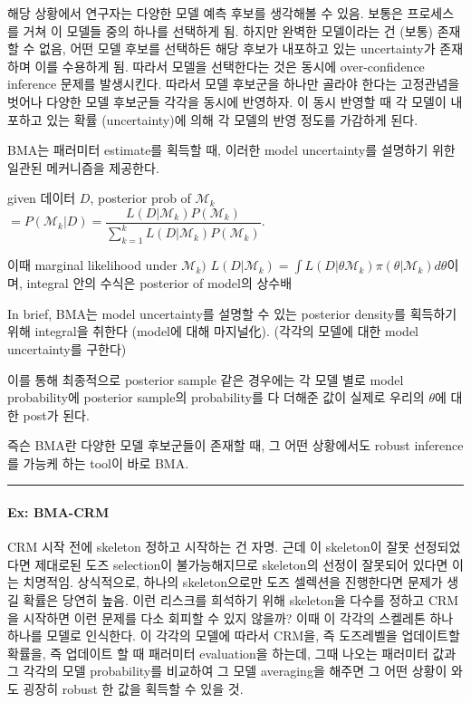 \documentclass[
]{book}
\begin{document}
해당 상황에서 연구자는 다양한 모델 예측 후보를 생각해볼 수 있음. 보통은 프로세스를 거쳐 이 모델들 중의 하나를 선택하게 됨. 하지만 완벽한 모델이라는 건 (보통) 존재할 수 없음, 어떤 모델 후보를 선택하든 해당 후보가 내포하고 있는 uncertainty가 존재하며 이를 수용하게 됨. 따라서 모델을 선택한다는 것은 동시에 over-confidence inference 문제를 발생시킨다. 따라서 모델 후보군을 하나만 골라야 한다는 고정관념을 벗어나 다양한 모델 후보군들 각각을 동시에 반영하자. 이 동시 반영할 때 각 모델이 내포하고 있는 확률 (uncertainty)에 의해 각 모델의 반영 정도를 가감하게 된다.

BMA는 패러미터 estimate를 획득할 때, 이러한 model uncertainty를 설명하기 위한 일관된 메커니즘을 제공한다.

given 데이터 \(D\), posterior prob of \(\mathcal{M}_k\) \(= P(\mathcal{M}_k \vert D) = \dfrac{L(D \vert \mathcal{M}_k) P(\mathcal{M}_k)}{\sum_{k=1}^k L(D \vert \mathcal{M}_k) P(\mathcal{M}_k)}\).

이때 marginal likelihood under \(\mathcal{M}_k)\) \(L(D \vert \mathcal{M}_k) = \int L(D \vert \theta \mathcal{M}_k) \pi(\theta \vert \mathcal{M}_k) d \theta\)이며, integral 안의 수식은 posterior of model의 상수배

In brief, BMA는 model uncertainty를 설명할 수 있는 posterior density를 획득하기 위해 integral을 취한다 (model에 대해 마지널化). (각각의 모델에 대한 model uncertainty를 구한다)

이를 통해 최종적으로 posterior sample 같은 경우에는 각 모델 별로 model probability에 posterior sample의 probability를 다 더해준 값이 실제로 우리의 \(\theta\)에 대한 post가 된다.

즉슨 BMA란 다양한 모델 후보군들이 존재할 때, 그 어떤 상황에서도 robust inference를 가능케 하는 tool이 바로 BMA.

\begin{center}\rule{0.5\linewidth}{0.5pt}\end{center}

\hypertarget{ex-bma-crm}{%
\paragraph{Ex: BMA-CRM}\label{ex-bma-crm}}

CRM 시작 전에 skeleton 정하고 시작하는 건 자명. 근데 이 skeleton이 잘못 선정되었다면 제대로된 도즈 selection이 불가능해지므로 skeleton의 선정이 잘못되어 있다면 이는 치명적임. 상식적으로, 하나의 skeleton으로만 도즈 셀렉션을 진행한다면 문제가 생길 확률은 당연히 높음. 이런 리스크를 희석하기 위해 skeleton을 다수를 정하고 CRM을 시작하면 이런 문제를 다소 회피할 수 있지 않을까? 이때 이 각각의 스켈레톤 하나하나를 모델로 인식한다. 이 각각의 모델에 따라서 CRM을, 즉 도즈레벨을 업데이트할 확률을, 즉 업데이트 할 때 패러미터 evaluation을 하는데, 그때 나오는 패러미터 값과 그 각각의 모델 probability를 비교하여 그 모델 averaging을 해주면 그 어떤 상황이 와도 굉장히 robust 한 값을 획득할 수 있을 것.
\end{document}
